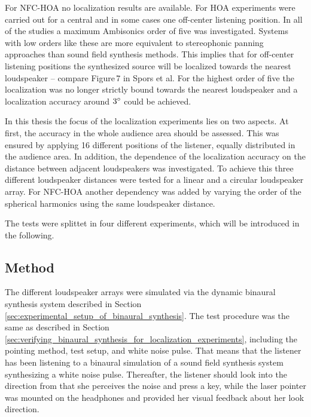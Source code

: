 For \ac{NFC-HOA} no localization results are available. For \ac{HOA} experiments
were carried out for a central and in some cases one off-center listening
position.\autocite[E.g.][]{Bertet2013}
In all of the studies a maximum Ambisonics order of five was investigated.
Systems with low orders like these are more
equivalent to stereophonic panning approaches than sound field synthesis
methods. This implies that for off-center listening positions the synthesized
source will be localized towards the nearest loudspeaker -- compare Figure\,7 in
Spors et al.\autocite{Spors2013a}
For the highest order of five the localization was no longer strictly bound
towards the nearest loudspeaker and a localization accuracy around
$3^\circ$ could be achieved.\autocite{Frank2008}

In this thesis the focus of the localization experiments lies on two aspects.
At first, the accuracy in the whole audience area should be assessed. This was ensured
by applying 16 different positions of the listener, equally distributed in the
audience area. In addition, the dependence of the localization accuracy on the
distance between adjacent loudspeakers was investigated. To achieve this
three different loudspeaker distances were tested for a linear and a circular
loudspeaker array. For \ac{NFC-HOA} another dependency was added by varying the order
of the spherical harmonics using the same loudspeaker distance.

The tests were splittet in four different experiments, which will be introduced
in the following.


\subsection{Method}
\label{sec:localization_method}
%
The different loudspeaker arrays were simulated via the dynamic binaural synthesis
system described in Section\,\ref{sec:experimental_setup_of_binaural_synthesis}.
The test procedure was the same as described in
Section\,\ref{sec:verifying_binaural_synthesis_for_localization_experiments},
including the pointing method, test setup, and white noise pulse.
That means that the listener has been listening to a binaural simulation of a sound
field synthesis system synthesizing a white noise pulse. Thereafter, the listener should
look into the direction from that she perceives the noise and press a key, while the
laser pointer was mounted on the headphones and provided her visual feedback about
her look direction.


